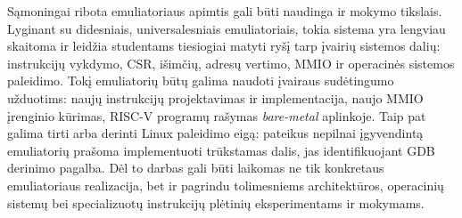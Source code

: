 Sąmoningai ribota emuliatoriaus apimtis gali būti naudinga ir mokymo tikslais. Lyginant su didesniais, universalesniais emuliatoriais, tokia sistema yra lengviau skaitoma ir leidžia studentams tiesiogiai matyti ryšį tarp įvairių sistemos dalių: instrukcijų vykdymo, CSR, išimčių, adresų vertimo, MMIO ir operacinės sistemos paleidimo. Tokį emuliatorių būtų galima naudoti įvairaus sudėtingumo užduotims: naujų instrukcijų projektavimas ir implementacija, naujo MMIO įrenginio kūrimas, RISC-V programų rašymas \textit{bare-metal} aplinkoje. Taip pat galima tirti arba derinti Linux paleidimo eigą: pateikus nepilnai įgyvendintą emuliatorių prašoma implementuoti trūkstamas dalis, jas identifikuojant GDB derinimo pagalba. Dėl to darbas gali būti laikomas ne tik konkretaus emuliatoriaus realizacija, bet ir pagrindu tolimesniems architektūros, operacinių sistemų bei specializuotų instrukcijų plėtinių eksperimentams ir mokymams.
